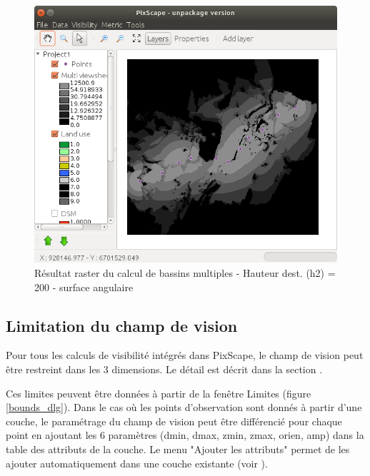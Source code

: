 \documentclass{report}
\begin{document}
\begin{figure}[H]
	\includegraphics[scale=0.5]{img/multi_viewshed_raster_deg-fr.png} 
	\caption{Résultat raster du calcul de bassins multiples - Hauteur dest. (h2) = 200 - surface angulaire}
	\label{multi_viewshed_raster_deg}
\end{figure}

\subsection{Limitation du champ de vision}
\label{bounds_ui}
Pour tous les calculs de visibilité intégrés dans PixScape, le champ de vision peut être restreint dans les 3 dimensions. Le détail est décrit dans la section .

Ces limites peuvent être données à partir de la fenêtre Limites (figure \ref{bounds_dlg}). Dans le cas où les points d'observation sont donnés à partir d'une couche, le paramétrage du champ de vision peut être différencié pour chaque point en ajoutant les 6 paramètres (dmin, dmax, zmin, zmax, orien, amp) dans la table des attributs de la couche. Le menu "Ajouter les attributs" permet de les ajouter automatiquement dans une couche existante (voir ).
\end{document}
